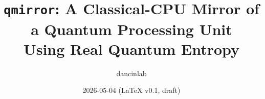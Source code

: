 \documentclass[aps,prl,reprint,amsmath,amssymb,floatfix,nofootinbib]{revtex4-2}
\newcommand{\qmirror}{\texttt{qmirror}}
\begin{document}
\title{\qmirror: A Classical-CPU Mirror of a Quantum Processing Unit\\Using Real Quantum Entropy}

\author{dancinlab}

\date{2026-05-04 (LaTeX v0.1, draft)}

\begin{abstract}

\end{abstract}

\maketitle













\appendix



\end{document}
